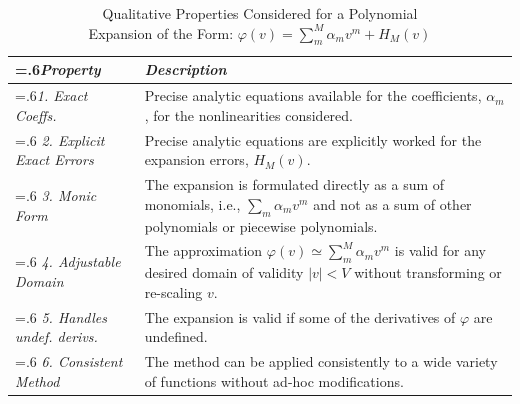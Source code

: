 \begin{table}
	\caption[Qualitative Properties Considered]{
		Qualitative Properties Considered for a
	    Polynomial \\ Expansion of the Form:
		$\varphi(v) = \sum_m^M \alpha_m v^m + H_M(v)$
		\vspace{1mm}
	}
	\begin{tabularx}{0.98\columnwidth}{
			>{\hsize=.6\hsize}X
			>{\hsize=1.4\hsize}X
		}
		\hline
		\textit{Property} & \textit{Description} \\
		\hline
		\hline
		\textit{1. Exact \mbox{Coeffs.}} 
		&
		Precise analytic equations available
		for the coefficients, $\alpha_m$, for the nonlinearities
		considered.
		\\
		\hline
		\textit{2. Explicit Exact Errors} 
		&
		Precise analytic equations are explicitly worked for
		the expansion errors, $H_M(v)$.
		\\
		\hline
		\textit{3. Monic Form}
		&
		The expansion is formulated directly as a sum of
		monomials, i.e., $\sum_m \alpha_m v^m$ and not as
		a sum of other polynomials or piecewise polynomials.
		\\
		\hline
		\textit{4. Adjustable Domain}
		&
		The approximation $\varphi(v) \simeq \sum_m^M \alpha_m v^m$
		is valid for any desired domain of validity $|v| < V$
		without transforming or re-scaling $v$.
		\\
		\hline
		\textit{5. Handles undef. derivs.}
		&
		The expansion is valid if some of the
		derivatives of $\varphi$ are undefined.
		\\
		\hline
		\textit{6. Consistent Method}
		&
		The method can be applied consistently to a wide
		variety of functions without ad-hoc modifications.
		\\
		\hline
	\end{tabularx}
	\label{table_expansion_properties_considered}
\end{table}

